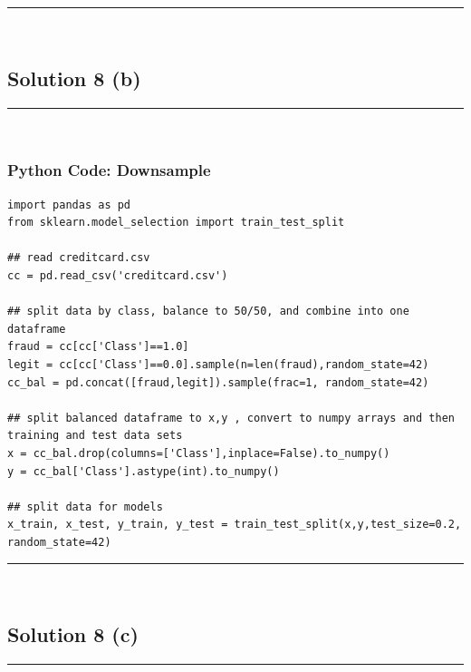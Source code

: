 \documentclass{article}
\begin{document}
\noindent\rule{\textwidth}{0.4pt}\\

\newpage

\subsection*{Solution 8 (b)}
\noindent\rule{\textwidth}{0.4pt}\\

\subsubsection*{Python Code: Downsample}
\begin{lstlisting}
import pandas as pd
from sklearn.model_selection import train_test_split

## read creditcard.csv
cc = pd.read_csv('creditcard.csv')

## split data by class, balance to 50/50, and combine into one dataframe
fraud = cc[cc['Class']==1.0]
legit = cc[cc['Class']==0.0].sample(n=len(fraud),random_state=42)
cc_bal = pd.concat([fraud,legit]).sample(frac=1, random_state=42)

## split balanced dataframe to x,y , convert to numpy arrays and then training and test data sets
x = cc_bal.drop(columns=['Class'],inplace=False).to_numpy()
y = cc_bal['Class'].astype(int).to_numpy()

## split data for models
x_train, x_test, y_train, y_test = train_test_split(x,y,test_size=0.2, random_state=42)
\end{lstlisting}

\noindent\rule{\textwidth}{0.4pt}\\

\newpage

\subsection*{Solution 8 (c)}
\noindent\rule{\textwidth}{0.4pt}\\
\end{document}
